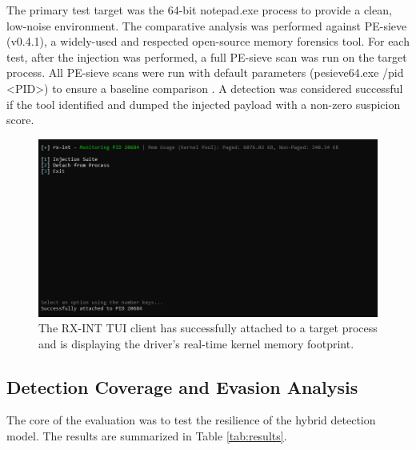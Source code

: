 \documentclass[journal]{IEEEtran}
\begin{document}
The primary test target was the 64-bit notepad.exe process to provide a clean, low-noise environment. The comparative analysis was performed against PE-sieve (v0.4.1), a widely-used and respected open-source memory forensics tool. For each test, after the injection was performed, a full PE-sieve scan was run on the target process. All PE-sieve scans were run with default parameters (pesieve64.exe /pid <PID>) to ensure a baseline comparison \cite{hasherezade_pesieve}. A detection was considered successful if the tool identified and dumped the injected payload with a non-zero suspicion score.
\begin{figure}[!t]
\centering
\includegraphics[width=0.9\columnwidth]{figures/tui_monitoring.png}
\caption{The RX-INT TUI client has successfully attached to a target process and is displaying the driver's real-time kernel memory footprint.}
\label{fig_tui_main}
\end{figure}
\subsection{Detection Coverage and Evasion Analysis}
The core of the evaluation was to test the resilience of the hybrid detection model. The results are summarized in Table \ref{tab:results}.
\end{document}

